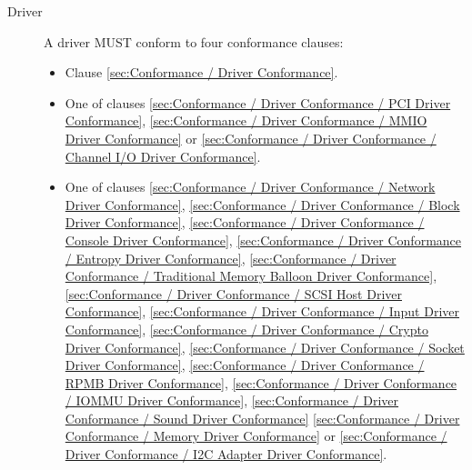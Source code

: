 \begin{description}
\item[Driver] A driver MUST conform to four conformance clauses:
  \begin{itemize}
    \item Clause \ref{sec:Conformance / Driver Conformance}.
    \item One of clauses \ref{sec:Conformance / Driver Conformance / PCI Driver Conformance}, \ref{sec:Conformance / Driver Conformance / MMIO Driver Conformance} or \ref{sec:Conformance / Driver Conformance / Channel I/O Driver Conformance}.
    \item One of clauses
\ref{sec:Conformance / Driver Conformance / Network Driver Conformance},
\ref{sec:Conformance / Driver Conformance / Block Driver Conformance},
\ref{sec:Conformance / Driver Conformance / Console Driver Conformance},
\ref{sec:Conformance / Driver Conformance / Entropy Driver Conformance},
\ref{sec:Conformance / Driver Conformance / Traditional Memory Balloon Driver Conformance},
\ref{sec:Conformance / Driver Conformance / SCSI Host Driver Conformance},
\ref{sec:Conformance / Driver Conformance / Input Driver Conformance},
\ref{sec:Conformance / Driver Conformance / Crypto Driver Conformance},
\ref{sec:Conformance / Driver Conformance / Socket Driver Conformance},
\ref{sec:Conformance / Driver Conformance / RPMB Driver Conformance},
\ref{sec:Conformance / Driver Conformance / IOMMU Driver Conformance},
\ref{sec:Conformance / Driver Conformance / Sound Driver Conformance}
\ref{sec:Conformance / Driver Conformance / Memory Driver Conformance} or
\ref{sec:Conformance / Driver Conformance / I2C Adapter Driver Conformance}.


\end{itemize}
\end{description}
